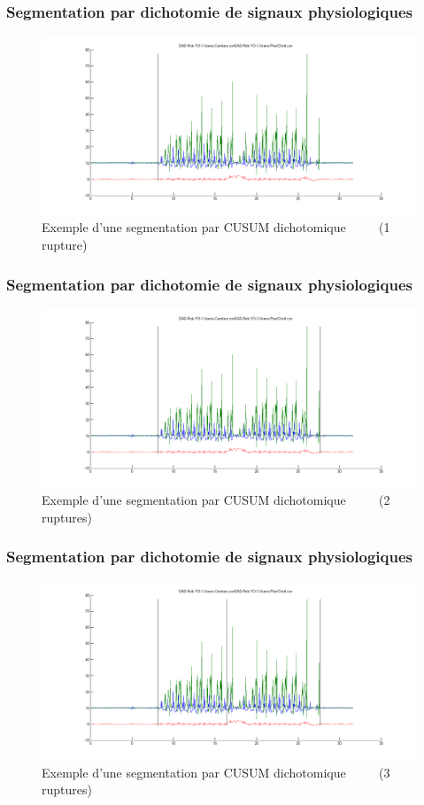 \documentclass{beamer}
\begin{document}
\begin{frame}
	\frametitle{Segmentation par dichotomie de signaux physiologiques}
	\begin{figure}
		\includegraphics[width=\linewidth]{dikt-seg1.png}
		\caption{Exemple d'une segmentation par CUSUM dichotomique
		~~~~
		(1 rupture)}
	\end{figure}
\end{frame}

\begin{frame}
	\frametitle{Segmentation par dichotomie de signaux physiologiques}
	\begin{figure}
		\includegraphics[width=\linewidth]{dikt-seg2.png}
		\caption{Exemple d'une segmentation par CUSUM dichotomique 
		~~~~
		(2 ruptures)}
	\end{figure}
\end{frame}

\begin{frame}
	\frametitle{Segmentation par dichotomie de signaux physiologiques}
	\begin{figure}
		\includegraphics[width=\linewidth]{dikt-seg3.png}
		\caption{Exemple d'une segmentation par CUSUM dichotomique
		~~~~
		(3 ruptures)}
	\end{figure}
\end{frame}
\end{document}

